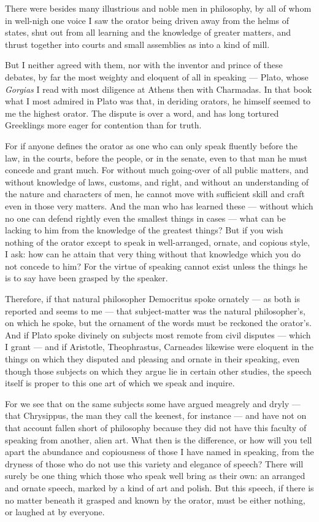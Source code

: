  There were besides many illustrious and noble men in philosophy, by all of whom in well-nigh one voice I saw the orator being driven away from the helms of states, shut out from all learning and the knowledge of greater matters, and thrust together into courts and small assemblies as into a kind of mill.

 But I neither agreed with them, nor with the inventor and prince of these debates, by far the most weighty and eloquent of all in speaking — Plato, whose \textit{Gorgias} I read with most diligence at Athens then with Charmadas. In that book what I most admired in Plato was that, in deriding orators, he himself seemed to me the highest orator. The dispute is over a word, and has long tortured Greeklings more eager for contention than for truth.

 For if anyone defines the orator as one who can only speak fluently before the law, in the courts, before the people, or in the senate, even to that man he must concede and grant much. For without much going-over of all public matters, and without knowledge of laws, customs, and right, and without an understanding of the nature and characters of men, he cannot move with sufficient skill and craft even in those very matters. And the man who has learned these — without which no one can defend rightly even the smallest things in cases — what can be lacking to him from the knowledge of the greatest things? But if you wish nothing of the orator except to speak in well-arranged, ornate, and copious style, I ask: how can he attain that very thing without that knowledge which you do not concede to him? For the virtue of speaking cannot exist unless the things he is to say have been grasped by the speaker.

 Therefore, if that natural philosopher Democritus spoke ornately — as both is reported and seems to me — that subject-matter was the natural philosopher's, on which he spoke, but the ornament of the words must be reckoned the orator's. And if Plato spoke divinely on subjects most remote from civil disputes — which I grant — and if Aristotle, Theophrastus, Carneades likewise were eloquent in the things on which they disputed and pleasing and ornate in their speaking, even though those subjects on which they argue lie in certain other studies, the speech itself is proper to this one art of which we speak and inquire.

 For we see that on the same subjects some have argued meagrely and dryly — that Chrysippus, the man they call the keenest, for instance — and have not on that account fallen short of philosophy because they did not have this faculty of speaking from another, alien art. What then is the difference, or how will you tell apart the abundance and copiousness of those I have named in speaking, from the dryness of those who do not use this variety and elegance of speech? There will surely be one thing which those who speak well bring as their own: an arranged and ornate speech, marked by a kind of art and polish. But this speech, if there is no matter beneath it grasped and known by the orator, must be either nothing, or laughed at by everyone.

